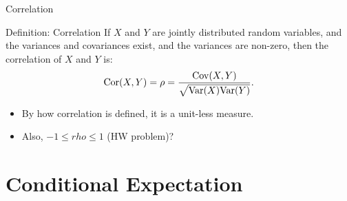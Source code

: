 \begin{frame}[allowframebreaks]{Correlation}

\begin{block}{Definition: Correlation}
  If $X$ and $Y$ are jointly distributed random variables, and the variances and covariances exist, and the variances are non-zero, then the correlation of $X$ and $Y$ is:
  $$
  \mathrm{Cor}(X, Y) = \rho = \frac{\mathrm{Cov}(X, Y)}{\sqrt{\mathrm{Var}(X)\mathrm{Var}(Y)}}.
  $$
\end{block}

\begin{itemize}
  \item By how correlation is defined, it is a unit-less measure. 
  \item Also, $-1 \leq rho \leq 1$ (HW problem)?
\end{itemize}

\end{frame}

\section{Conditional Expectation}

